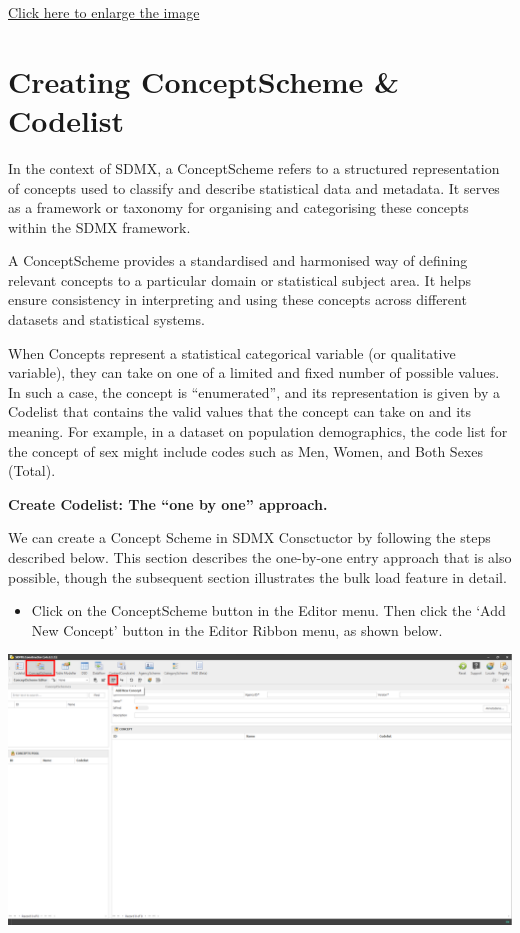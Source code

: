 \documentclass[
]{book}
\providecommand{\tightlist}{%
  \setlength{\itemsep}{0pt}\setlength{\parskip}{0pt}}
\begin{document}
\href{images/image080.png}{Click here to enlarge the image}

\hypertarget{creating-conceptscheme}{%
\section{Creating ConceptScheme \& Codelist}\label{creating-conceptscheme}}

In the context of SDMX, a ConceptScheme refers to a structured representation of concepts used to classify and describe statistical data and metadata. It serves as a framework or taxonomy for organising and categorising these concepts within the SDMX framework.

A ConceptScheme provides a standardised and harmonised way of defining relevant concepts to a particular domain or statistical subject area. It helps ensure consistency in interpreting and using these concepts across different datasets and statistical systems.

When Concepts represent a statistical categorical variable (or qualitative variable), they can take on one of a limited and fixed number of possible values. In such a case, the concept is ``enumerated'', and its representation is given by a Codelist that contains the valid values that the concept can take on and its meaning. For example, in a dataset on population demographics, the code list for the concept of sex might include codes such as Men, Women, and Both Sexes (Total).

\textbf{Create Codelist: The ``one by one'' approach.}

We can create a Concept Scheme in SDMX Consctuctor by following the steps described below. This section describes the one-by-one entry approach that is also possible, though the subsequent section illustrates the bulk load feature in detail.

\begin{itemize}
\tightlist
\item
  Click on the ConceptScheme button in the Editor menu. Then click the `Add New Concept' button in the Editor Ribbon menu, as shown below.
\end{itemize}

\begin{center}\includegraphics[width=1\linewidth]{./images/image239} \end{center}
\end{document}
